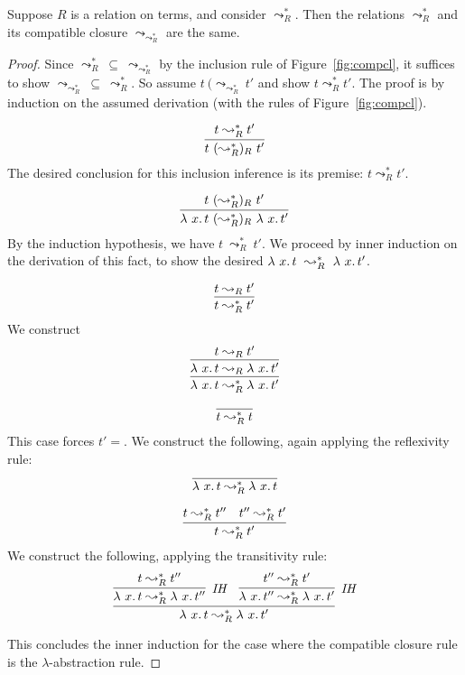 \begin{lemma}
\label{lem:comprtc}
  Suppose $R$ is a relation on terms, and consider $\leadsto_R^*$.
  Then the relations $\leadsto_R^*$  and its compatible closure $\leadsto_{\leadsto_R^*}$ are the same.
\end{lemma}
\begin{proof}
  Since $\leadsto_R^*\ \subseteq\ \leadsto_{\leadsto_R^*}$ by the inclusion rule
  of Figure~\ref{fig:compcl}, it suffices to show $\leadsto_{\leadsto_R^*}\ \subseteq\ \leadsto_R^*$.
  So assume $t\ (\leadsto_{\leadsto_R^*}\ t'$ and show $t \leadsto_R^* t'$.  The proof
  is by induction on the assumed derivation (with the rules of Figure~\ref{fig:compcl}).

  \case{ } 
  \[
  \infer{t\ (\leadsto_R^*)_R\ t'}{t \leadsto_R^* t'}
  \]
  \noindent The desired conclusion for this inclusion inference is its premise: $t \leadsto_R^* t'$.

  \case{ }
  \[
  \infer{\lam{x}{t}\ (\leadsto_R^*)_R\ \lam{x}{t'}}{t\ (\leadsto_R^*)_R\ t'}
  \]
  \noindent By the induction hypothesis, we have $t\ \leadsto_R^*\ t'$.  We
  proceed by inner induction on the derivation of this fact, to show
  the desired $\lam{x}{t}\ \leadsto_R^*\ \lam{x}{t'}$.

  \[
  \infer{t \leadsto_R^* t'}{t \leadsto_R t'}
  \]
  \noindent We construct
  \[
  \infer{\lam{x}{t} \leadsto_R^* \lam{x}{t'}}
        {\infer{\lam{x}{t} \leadsto_R \lam{x}{t'}}
          {t \leadsto_R t'}}
  \]

  \[
  \infer{t \leadsto_R^* t}{\ }
  \]
  \noindent This case forces $t' = $.  We construct the following, again applying the reflexivity rule:
  \[
  \infer{\lam{x}{t} \leadsto_R^* \lam{x}{t}}{\ }
  \]

  \[
  \infer{t \leadsto_R^* t'}{t \leadsto_R^* t'' & t'' \leadsto_R^* t'}
  \]
  \noindent We construct the following, applying the transitivity rule:
  \[
  \infer{\lam{x}{t} \leadsto_R^* \lam{x}{t'}}{\infer[\textit{IH}]{\lam{x}{t} \leadsto_R^* \lam{x}{t''}}{t \leadsto_R^* t''}
                                             & \infer[\textit{IH}]{\lam{x}{t''} \leadsto_R^* \lam{x}{t'}}{t'' \leadsto_R^* t'}}
  \]

  \noindent This concludes the inner induction for the case where the compatible closure rule is the $\lambda$-abstraction rule.


  \end{proof}
        
